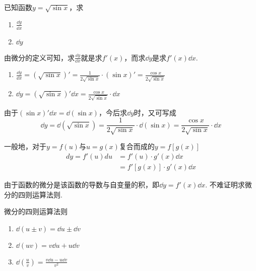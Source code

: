 \begin{example}
已知函数$y=\sqrt{\sin x}$，求
\begin{multicols}{2}
\begin{enumerate}[(1)]
    \item $\frac{\dd y}{\dd x}$
    \item $\dd y$
\end{enumerate}
\end{multicols}
\end{example}

\begin{analyze}
由微分的定义可知，求$\frac{\dd y}{\dd x}$就是求$f'(x)$，而求$\dd y$是求$f'(x)\dd x$.   
\end{analyze}

\begin{solution}
\begin{enumerate}[(1)]
    \item $\frac{\dd y}{\dd x}=\left(\sqrt{\sin x}\right)'=\frac{1}{2\sqrt{\sin x}}\cdot (\sin x)'=\frac{\cos x}{2\sqrt{\sin x}}$
    \item $\dd y=\left(\sqrt{\sin x}\right)'\dd x=\frac{\cos x}{2\sqrt{\sin x}}\cdot \dd x$
\end{enumerate}
\end{solution}

\begin{rmk}
    由于$(\sin x)'\dd x=\dd(\sin x)$，今后求$\dd y$时，又可写成
\[\dd y=\dd\left(\sqrt{\sin x}\right)=\frac{1}{2\sqrt{\sin x}}\cdot \dd (\sin x)=\frac{\cos x}{2\sqrt{\sin x}}\cdot \dd x\]
\end{rmk}

一般地，对于$y=f(u)$与$u=g(x)$复合而成的$y=f[g(x)]$
\[\begin{split}
    dy=f'(u)du&=f'(u)\cdot g'(x)\dd x\\
&=f'[g(x)]\cdot g'(x)\dd x
\end{split}\]

由于函数的微分是该函数的导数与自变量的积，即$\dd y=f'(x)\dd x$. 不难证明求微分的四则运算法则.

\begin{thm}{微分的四则运算法则}
\begin{multicols}{2}
\begin{enumerate}[(1)]
    \item $\dd (u\pm v)=\dd u\pm \dd v$
    \item $\dd(uv)=v\dd u+u\dd v$
    \item $\dd\left(\frac{u}{v}\right)=\frac{v\dd u-u\dd v}{v^2}$
\end{enumerate}        
\end{multicols}
\end{thm}

